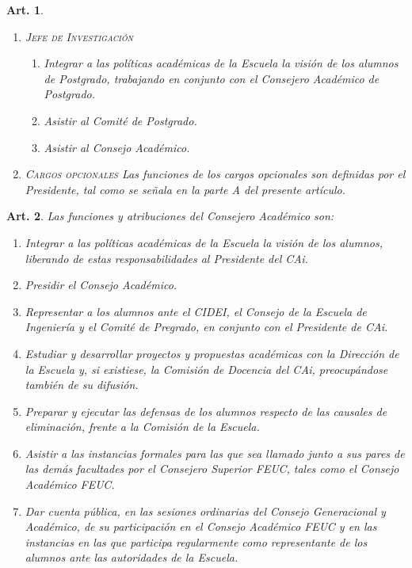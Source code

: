 \documentclass[letterpaper,11pt]{article}
\theoremstyle{plain}
\newtheorem{art}{Art.} %
\begin{document}
\begin{art}
\begin{enumerate}
				\item \textsc{Jefe de Investigación}
					\begin{enumerate}
						\item Integrar a las políticas académicas de la Escuela la visión de los alumnos de Postgrado, trabajando en conjunto con el Consejero Académico de Postgrado.
						\item Asistir al Comité de Postgrado.
						\item Asistir al Consejo Académico.
					\end{enumerate}
					
				\item \textsc{Cargos opcionales}
					Las funciones de los cargos opcionales son definidas por el Presidente, tal como se señala en la parte A del presente artículo. 
			\end{enumerate}
		\end{art}

		\begin{art}\label{funcionesCAPregrado}
			Las funciones y atribuciones del Consejero Académico son:
			\begin{enumerate}
				\item Integrar a las políticas académicas de la Escuela la visión de los alumnos, liberando de estas responsabilidades al Presidente del CAi.
				\item Presidir el Consejo Académico.
				\item Representar a los alumnos ante el \emph{CIDEI}, el Consejo de la Escuela de Ingeniería y el Comité de Pregrado, en conjunto con el Presidente de CAi.
				\item Estudiar y desarrollar proyectos y propuestas académicas con la Dirección de la Escuela y, si existiese, la Comisión de Docencia del CAi, preocupándose también de su difusión.
				\item Preparar y ejecutar las defensas de los alumnos respecto de las causales de eliminación, frente a la Comisión de la Escuela.
				\item Asistir a las instancias formales para las que sea llamado junto a sus pares de las demás facultades por el Consejero Superior FEUC, tales como el Consejo Académico FEUC.
				\item Dar cuenta pública, en las sesiones ordinarias del Consejo Generacional y Académico, de su participación en el Consejo Académico FEUC y en las instancias en las que participa regularmente como representante de los alumnos ante las autoridades de la Escuela.
			\end{enumerate}
		\end{art}
\end{document}
